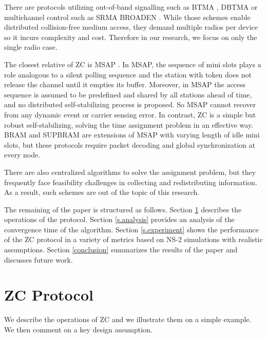 \documentclass{acm_proc_article-sp}
\begin{document}
There are protocols utilizing out-of-band signalling such as BTMA \cite{1975KLEINROCK2}, DBTMA \cite{2002DBTMA} or multichannel control such as SRMA \cite{1976KLEINROCK3} BROADEN \cite{2003BROADEN}. While those schemes enable distributed collision-free medium access, they demand multiple radios per device so it incurs complexity and cost. Therefore in our research, we focus on only the single radio case.

The closest relative of ZC is MSAP \cite{1980MSAP}. In MSAP, the sequence of mini slots plays a role analogous to a silent polling sequence  and the station with token does not release the channel until it empties its buffer. Moreover, in MSAP the access sequence is assumed to be predefined and shared by all stations ahead of time, and no distributed self-stabilizing process is proposed. So MSAP cannot recover from any dynamic event or carrier sensing error. In contrast, ZC is a simple but robust self-stabilizing, solving the time assignment problem in an effective way. BRAM \cite{1979BRAM} and SUPBRAM \cite{1985SUPBRAM} are extensions of MSAP with varying length of idle mini slots, but these protocols require packet decoding and global synchronization at every node.

There are also centralized algorithms to solve the assignment problem, but they frequently face feasibility challenges in collecting and redistributing information. As a result, such schemes are out of the topic of this research.

The remaining of the paper is structured as follows. Section \ref{s.algorithm} describes the operations of the protocol.  Section \ref{s.analysis} provides an analysis of the convergence time of the algorithm. Section \ref{s.experiment} shows the performance of the ZC protocol in a variety of metrics based on NS-2 simulations with realistic assumptions.  Section \ref{conclusion} summarizes the results of the paper and discusses future work.

\section{ZC Protocol} \label{s.algorithm}
We describe the operations of ZC and we illustrate them on a simple example.  We then comment on a key design assumption.
\end{document}
